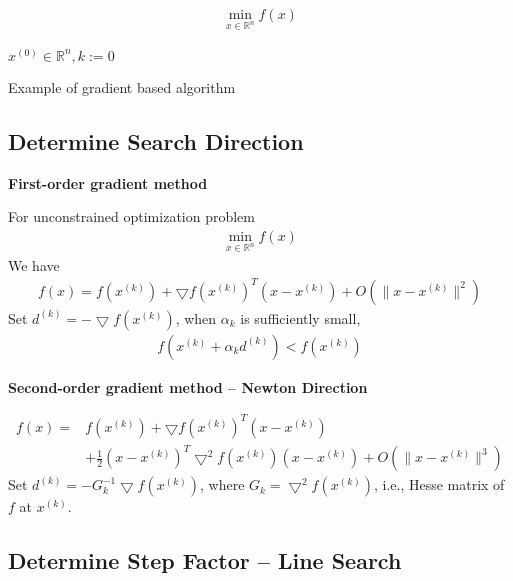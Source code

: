 \documentclass[runningheads]{llncs}
\begin{document}
\begin{align}
    \min_{x \in \mathbb{R}^n} f(x)
\end{align}
\begin{algorithm}[H]
    \SetAlgoLined
     $x^{(0)} \in \mathbb{R}^n, k:= 0$\;
     \caption{Example of gradient based algorithm}
\end{algorithm}
\subsection{Determine Search Direction}
\noindent\textbf{First-order gradient method}
\par
For unconstrained optimization problem 
\begin{align}
    \min_{x \in \mathbb{R}^n} f(x)
\end{align}
We have
\begin{align}
    f(x) = f(x^{(k)}) + \bigtriangledown f(x^{(k)})^T(x - x^{(k)})
    + O(\parallel x - x^{(k)} \parallel^2)
\end{align}
Set $d^{(k)} = - \bigtriangledown f(x^{(k)})$,
when $\alpha_k$ is sufficiently small,
\begin{align}
    f(x^{(k)} + \alpha_k d^{(k)}) < f(x^{(k)})
\end{align}

\noindent\textbf{Second-order gradient method -- Newton Direction}
\par
\begin{align}
    f(x) = &f(x^{(k)}) + \bigtriangledown f(x^{(k)})^T(x - x^{(k)}) \\
    &+ \frac{1}{2} (x - x^{(k)})^T \bigtriangledown^2 f(x^{(k)}) (x - x^{(k)})
    + O(\parallel x - x^{(k)} \parallel^3)
\end{align}
Set $d^{(k)} = -G_k^{-1} \bigtriangledown f(x^{(k)})$,
 where $G_k = \bigtriangledown^2 f(x^{(k)})$,
 i.e., Hesse matrix of $f$ at $x^{(k)}$.
\subsection{Determine Step Factor -- Line Search}
\end{document}

